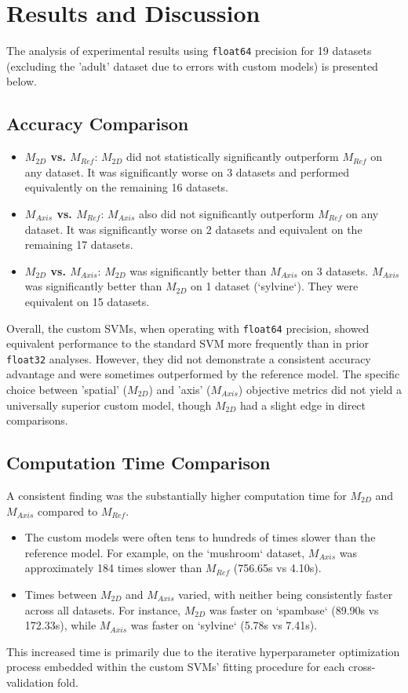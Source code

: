 \documentclass[conference]{IEEEtran} %
\begin{document}
\section{Results and Discussion}
The analysis of experimental results using \texttt{float64} precision for 19 datasets (excluding the 'adult' dataset due to errors with custom models) is presented below.

\subsection{Accuracy Comparison}
\begin{itemize}
    \item \textbf{$M_{2D}$ vs. $M_{Ref}$}: $M_{2D}$ did not statistically significantly outperform $M_{Ref}$ on any dataset. It was significantly worse on 3 datasets and performed equivalently on the remaining 16 datasets.
    \item \textbf{$M_{Axis}$ vs. $M_{Ref}$}: $M_{Axis}$ also did not significantly outperform $M_{Ref}$ on any dataset. It was significantly worse on 2 datasets and equivalent on the remaining 17 datasets.
    \item \textbf{$M_{2D}$ vs. $M_{Axis}$}: $M_{2D}$ was significantly better than $M_{Axis}$ on 3 datasets. $M_{Axis}$ was significantly better than $M_{2D}$ on 1 dataset (`sylvine`). They were equivalent on 15 datasets.
\end{itemize}
Overall, the custom SVMs, when operating with \texttt{float64} precision, showed equivalent performance to the standard SVM more frequently than in prior \texttt{float32} analyses. However, they did not demonstrate a consistent accuracy advantage and were sometimes outperformed by the reference model. The specific choice between 'spatial' ($M_{2D}$) and 'axis' ($M_{Axis}$) objective metrics did not yield a universally superior custom model, though $M_{2D}$ had a slight edge in direct comparisons.

\subsection{Computation Time Comparison}
A consistent finding was the substantially higher computation time for $M_{2D}$ and $M_{Axis}$ compared to $M_{Ref}$.
\begin{itemize}
    \item The custom models were often tens to hundreds of times slower than the reference model. For example, on the `mushroom` dataset, $M_{Axis}$ was approximately 184 times slower than $M_{Ref}$ (756.65s vs 4.10s).
    \item Times between $M_{2D}$ and $M_{Axis}$ varied, with neither being consistently faster across all datasets. For instance, $M_{2D}$ was faster on `spambase` (89.90s vs 172.33s), while $M_{Axis}$ was faster on `sylvine` (5.78s vs 7.41s).
\end{itemize}
This increased time is primarily due to the iterative hyperparameter optimization process embedded within the custom SVMs' fitting procedure for each cross-validation fold.
\end{document}

